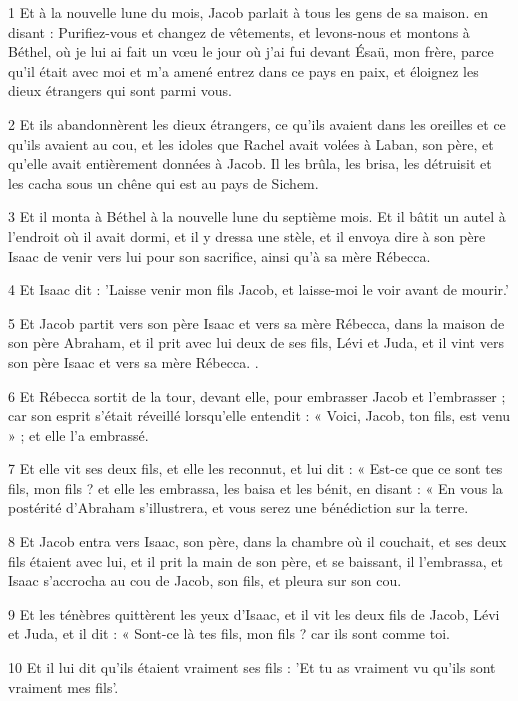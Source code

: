 \par 1 Et à la nouvelle lune du mois, Jacob parlait à tous les gens de sa maison. en disant : Purifiez-vous et changez de vêtements, et levons-nous et montons à Béthel, où je lui ai fait un vœu le jour où j'ai fui devant Ésaü, mon frère, parce qu'il était avec moi et m'a amené entrez dans ce pays en paix, et éloignez les dieux étrangers qui sont parmi vous.
\par 2 Et ils abandonnèrent les dieux étrangers, ce qu'ils avaient dans les oreilles et ce qu'ils avaient au cou, et les idoles que Rachel avait volées à Laban, son père, et qu'elle avait entièrement données à Jacob. Il les brûla, les brisa, les détruisit et les cacha sous un chêne qui est au pays de Sichem.
\par 3 Et il monta à Béthel à la nouvelle lune du septième mois. Et il bâtit un autel à l'endroit où il avait dormi, et il y dressa une stèle, et il envoya dire à son père Isaac de venir vers lui pour son sacrifice, ainsi qu'à sa mère Rébecca.
\par 4 Et Isaac dit : 'Laisse venir mon fils Jacob, et laisse-moi le voir avant de mourir.'
\par 5 Et Jacob partit vers son père Isaac et vers sa mère Rébecca, dans la maison de son père Abraham, et il prit avec lui deux de ses fils, Lévi et Juda, et il vint vers son père Isaac et vers sa mère Rébecca. .
\par 6 Et Rébecca sortit de la tour, devant elle, pour embrasser Jacob et l'embrasser ; car son esprit s'était réveillé lorsqu'elle entendit : « Voici, Jacob, ton fils, est venu » ; et elle l'a embrassé.
\par 7 Et elle vit ses deux fils, et elle les reconnut, et lui dit : « Est-ce que ce sont tes fils, mon fils ? et elle les embrassa, les baisa et les bénit, en disant : « En vous la postérité d'Abraham s'illustrera, et vous serez une bénédiction sur la terre.
\par 8 Et Jacob entra vers Isaac, son père, dans la chambre où il couchait, et ses deux fils étaient avec lui, et il prit la main de son père, et se baissant, il l'embrassa, et Isaac s'accrocha au cou de Jacob, son fils, et pleura sur son cou.
\par 9 Et les ténèbres quittèrent les yeux d'Isaac, et il vit les deux fils de Jacob, Lévi et Juda, et il dit : « Sont-ce là tes fils, mon fils ? car ils sont comme toi.
\par 10 Et il lui dit qu'ils étaient vraiment ses fils : 'Et tu as vraiment vu qu'ils sont vraiment mes fils'.
